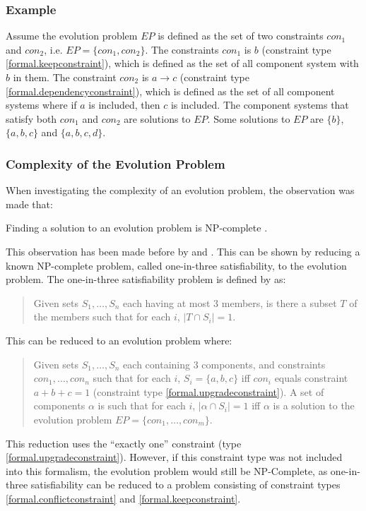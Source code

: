 \subsubsection{Example}
Assume the evolution problem $EP$ is defined as the set of two constraints $con_1$ and $con_2$, i.e. $EP = \{con_1,con_2\}$.
The constraints $con_1$ is $b$ (constraint type \ref{formal.keepconstraint}), which is defined as the set of all component system with $b$ in them.
The constraint $con_2$ is $a \rightarrow c$ (constraint type \ref{formal.dependencyconstraint}), which is defined as the set of all component systems where if $a$ is included, then $c$ is included.
The component systems that satisfy both $con_1$ and $con_2$ are solutions to $EP$.
Some solutions to $EP$ are $\{b\}$, $\{a,b,c\}$ and $\{a,b,c,d\}$.

\subsubsection{Complexity of the Evolution Problem}
When investigating the complexity of an evolution problem, the observation was made that:
\begin{obs}
Finding a solution to an evolution problem is NP-complete \citep{cook1971}.
\end{obs}
This observation has been made before by \cite{Mancinelli2006} and \cite{abate2011}.
This can be shown by reducing a known NP-complete problem, called one-in-three satisfiability, to the evolution problem.
The one-in-three satisfiability problem is defined by \cite{Schaefer1978} as:
\begin{quote}
Given sets $S_1, \ldots, S_n$ each having at most 3 members, is there a subset $T$ of the members such that for each $i$, $|T \cap S_i|  =  1$.
\end{quote}

This can be reduced to an evolution problem where:
\begin{quote}
Given sets $S_1, \ldots, S_n$ each containing 3 components, and constraints $con_1,\ldots,con_n$
such that for each $i$, $S_i = \{a,b,c\}$ iff $con_i$ equals constraint $a + b + c = 1$ (constraint type \ref{formal.upgradeconstraint}).
A set of components $\alpha$ is such that for each $i$, $|\alpha \cap S_i|  =  1$ iff $\alpha$ is a solution to the evolution problem $EP = \{con_1,\ldots,con_m\}$.
\end{quote}

This reduction uses the ``exactly one'' constraint (type \ref{formal.upgradeconstraint}).
However, if this constraint type was not included into this formalism, the evolution problem would still be NP-Complete,
as one-in-three satisfiability can be reduced to a problem consisting of  constraint types \ref{formal.conflictconstraint} and \ref{formal.keepconstraint}.

